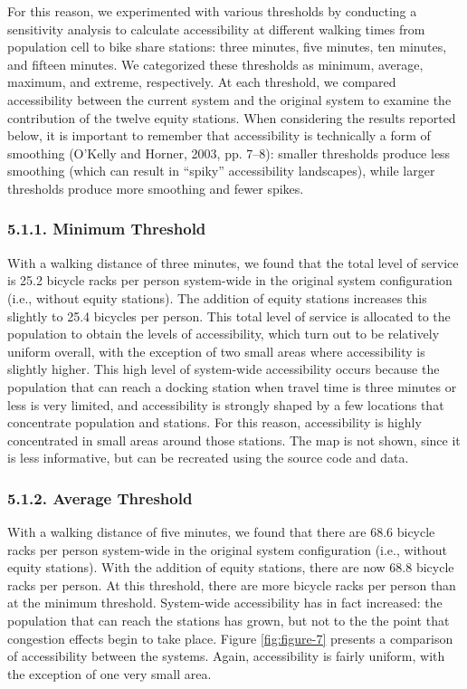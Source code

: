 \documentclass[]{elsarticle} %
\begin{document}
For this reason, we experimented with various thresholds by conducting a
sensitivity analysis to calculate accessibility at different walking
times from population cell to bike share stations: three minutes, five
minutes, ten minutes, and fifteen minutes. We categorized these
thresholds as minimum, average, maximum, and extreme, respectively. At
each threshold, we compared accessibility between the current system and
the original system to examine the contribution of the twelve equity
stations. When considering the results reported below, it is important
to remember that accessibility is technically a form of smoothing
(O'Kelly and Horner, 2003, pp. 7--8): smaller thresholds produce less
smoothing (which can result in ``spiky'' accessibility landscapes),
while larger thresholds produce more smoothing and fewer spikes.

\hypertarget{minimum-threshold}{%
\subsubsection{5.1.1. Minimum Threshold}\label{minimum-threshold}}

With a walking distance of three minutes, we found that the total level
of service is 25.2 bicycle racks per person system-wide in the original
system configuration (i.e., without equity stations). The addition of
equity stations increases this slightly to 25.4 bicycles per person.
This total level of service is allocated to the population to obtain the
levels of accessibility, which turn out to be relatively uniform
overall, with the exception of two small areas where accessibility is
slightly higher. This high level of system-wide accessibility occurs
because the population that can reach a docking station when travel time
is three minutes or less is very limited, and accessibility is strongly
shaped by a few locations that concentrate population and stations. For
this reason, accessibility is highly concentrated in small areas around
those stations. The map is not shown, since it is less informative, but
can be recreated using the source code and data.

\hypertarget{average-threshold}{%
\subsubsection{5.1.2. Average Threshold}\label{average-threshold}}

With a walking distance of five minutes, we found that there are 68.6
bicycle racks per person system-wide in the original system
configuration (i.e., without equity stations). With the addition of
equity stations, there are now 68.8 bicycle racks per person. At this
threshold, there are more bicycle racks per person than at the minimum
threshold. System-wide accessibility has in fact increased: the
population that can reach the stations has grown, but not to the the
point that congestion effects begin to take place. Figure
\ref{fig:figure-7} presents a comparison of accessibility between the
systems. Again, accessibility is fairly uniform, with the exception of
one very small area.
\end{document}

